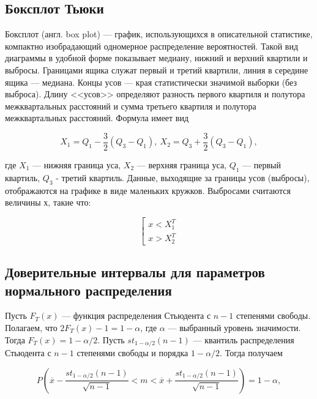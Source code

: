 \documentclass[12pt,a4paper]{article}
\begin{document}
	\subsection{Боксплот Тьюки}

	Боксплот (англ. box plot) — график, использующихся в описательной статистике, компактно изобрадающий одномерное распределение вероятностей. Такой вид диаграммы в удобной форме показывает медиану, нижний и верхний квартили и выбросы. Границами ящика служат первый и третий квартили, линия в середине ящика — медиана. Концы усов — края статистически значимой выборки (без выброса). Длину <<усов>> определяют разность первого квартиля и полутора межквартальных расстояний и сумма третьего квартиля и полутора межквартальных расстояний. Формула имеет вид

	\begin{equation} \label{eq:box_plot}
		X_1 = Q_1 - \frac{3}{2}(Q_3 - Q_1), \ X_2 = Q_3 + \frac{3}{2}(Q_3 - Q_1),
	\end{equation}

	где $X_1$ — нижняя граница уса, $X_2$ — верхняя граница уса, $Q_1$ — первый квартиль, $Q_3$ - третий квартиль.
	Данные, выходящие за границы усов (выбросы), отображаются на графике в виде маленьких кружков.
	Выбросами считаются величины $х$, такие что:

	\begin{equation} \label{eq:outlier}
		\left[
			\begin{array}{ll}
					x < X_1^T \\
					x > X_2^T
			\end{array}
		\right .
	\end{equation}

	\subsection{Доверительные интервалы для параметров нормального распределения}

	Пусть $F_T(x)$ — функция распределения Стьюдента с $n - 1$ степенями свободы. Полагаем, что $2F_T(x) - 1 = 1 - \alpha$, где $\alpha$ — выбранный уровень значимости. Тогда $F_T(x) = 1 - \alpha / 2$. Пусть $st_{1 - \alpha / 2}(n - 1)$ — квантиль распределения Стьюдента с $n - 1$ степенями свободы и порядка $1 - \alpha / 2$. Тогда получаем

	\begin{equation} \label{eq:normal_mean_boundaries}
		P \left ( \overline x - \frac{st_{1 - \alpha / 2}(n - 1)}{\sqrt{n - 1}} < m < \overline x + \frac{st_{1 - \alpha / 2}(n - 1)}{\sqrt{n - 1}} \right ) = 1 - \alpha,
	\end{equation}
\end{document}
